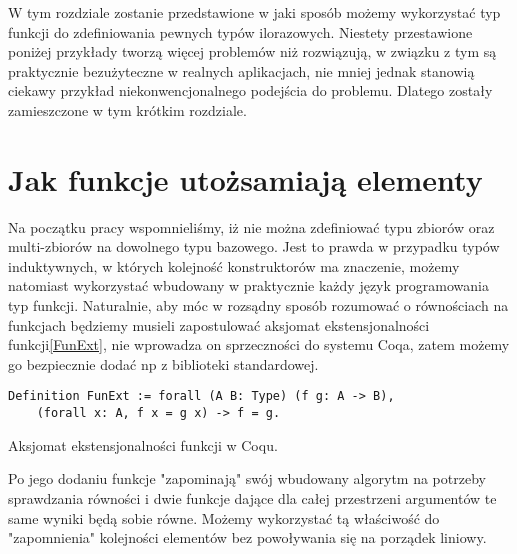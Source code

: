 W tym rozdziale zostanie przedstawione w jaki sposób możemy wykorzystać typ funkcji do zdefiniowania pewnych typów ilorazowych. Niestety przestawione poniżej przykłady tworzą więcej problemów niż rozwiązują, w związku z tym są praktycznie bezużyteczne w realnych aplikacjach, nie mniej jednak stanowią ciekawy przykład niekonwencjonalnego podejścia do problemu. Dlatego zostały zamieszczone w tym krótkim rozdziale.
\section{Jak funkcje utożsamiają elementy}
Na początku pracy wspomnieliśmy, iż nie można zdefiniować typu zbiorów oraz multi-zbiorów na dowolnego typu bazowego. Jest to prawda w przypadku typów induktywnych, w których kolejność konstruktorów ma znaczenie, możemy natomiast wykorzystać wbudowany w praktycznie każdy język programowania typ funkcji. Naturalnie, aby móc w rozsądny sposób rozumować o równościach na funkcjach będziemy musieli zapostulować aksjomat ekstensjonalności funkcji\ref{FunExt}, nie wprowadza on sprzeczności do systemu Coqa, zatem możemy go bezpiecznie dodać np z biblioteki standardowej.
\begin{code}
\begin{verbatim}
Definition FunExt := forall (A B: Type) (f g: A -> B),
    (forall x: A, f x = g x) -> f = g.
\end{verbatim}
\caption{Aksjomat ekstensjonalności funkcji w Coqu.}
\label{FunExt}
\end{code}
Po jego dodaniu funkcje "zapominają" swój wbudowany algorytm na potrzeby sprawdzania równości i dwie funkcje dające dla całej przestrzeni argumentów te same wyniki będą sobie równe. Możemy wykorzystać tą właściwość do "zapomnienia" kolejności elementów bez powoływania się na porządek liniowy. 
